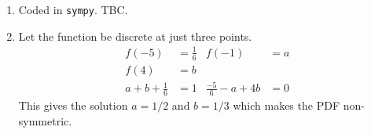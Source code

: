 \begin{enumerate}
\begin{enumerate}
              \item Coded in \texttt{sympy}. TBC.

              \item Let the function be discrete at just three points.
                    \begin{align}
                        f(-5)           & = \frac{1}{6} & f(-1)                 & = a \\
                        f(4)            & = b                                         \\
                        a+b+\frac{1}{6} & = 1           & \frac{-5}{6} - a + 4b & = 0
                    \end{align}
                    This gives the solution $ a=1/2 $ and $ b = 1/3 $ which makes the
                    PDF non-symmetric.
          \end{enumerate}
\end{enumerate}